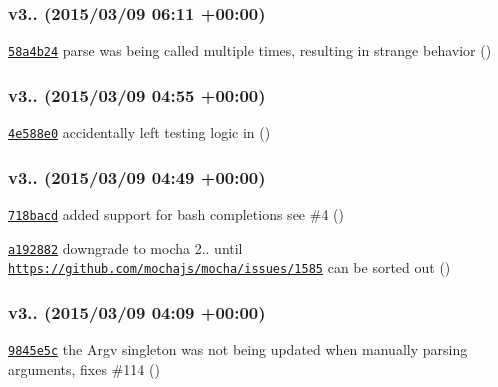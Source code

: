 \subsubsection*{v3.. (2015/03/09 06\+:11 +00\+:00)}


\begin{DoxyItemize}
\item \href{https://github.com/bcoe/yargs/commit/58a4b2473ebbb326713d522be53e32d3aabb08d2}{\tt 58a4b24} parse was being called multiple times, resulting in strange behavior ()
\end{DoxyItemize}

\subsubsection*{v3.. (2015/03/09 04\+:55 +00\+:00)}


\begin{DoxyItemize}
\item \href{https://github.com/bcoe/yargs/commit/4e588e055afbeb9336533095f051496e3977f515}{\tt 4e588e0} accidentally left testing logic in ()
\end{DoxyItemize}

\subsubsection*{v3.. (2015/03/09 04\+:49 +00\+:00)}


\begin{DoxyItemize}
\item \href{https://github.com/bcoe/yargs/commit/718bacd81b9b44f786af76b2afe491fe06274f19}{\tt 718bacd} added support for bash completions see \#4 ()
\item \href{https://github.com/bcoe/yargs/commit/a19288270fc431396c42af01125eeb4443664528}{\tt a192882} downgrade to mocha 2.. until \href{https://github.com/mochajs/mocha/issues/1585}{\tt https\+://github.\+com/mochajs/mocha/issues/1585} can be sorted out ()
\end{DoxyItemize}

\subsubsection*{v3.. (2015/03/09 04\+:09 +00\+:00)}


\begin{DoxyItemize}
\item \href{https://github.com/bcoe/yargs/commit/9845e5c1a9c684ba0be3f0bfb40e7b62ab49d9c8}{\tt 9845e5c} the Argv singleton was not being updated when manually parsing arguments, fixes \#114 ()
\end{DoxyItemize}

